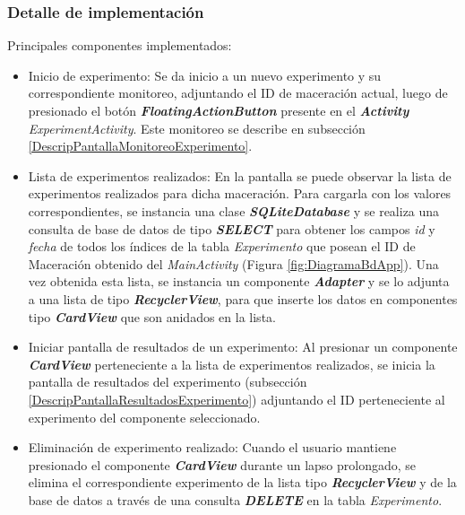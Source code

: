             \subsubsection{Detalle de implementación}
                \par Principales componentes implementados:
                \begin{itemize}
                    \item Inicio de experimento: Se da inicio a un nuevo experimento y su correspondiente monitoreo, adjuntando el ID de maceración actual, luego de presionado el botón \textbf{\textit{\gls{FloatingActionButton}}} presente en el \textbf{\textit{Activity}} \textit{ExperimentActivity}. Este monitoreo se describe en subsección \ref{DescripPantallaMonitoreoExperimento}.
                    
                    \item Lista de experimentos realizados: En la pantalla se puede observar la lista de experimentos realizados para dicha maceración. Para cargarla con los valores correspondientes, se instancia una clase \textbf{\textit{\gls{SQLiteDatabase}}} y se realiza una consulta de base de datos de tipo \textbf{\textit{\gls{SELECT}}} para obtener los campos \textit{id} y \textit{fecha} de todos los índices de la tabla \textit{Experimento} que posean el ID de Maceración obtenido del \textit{MainActivity}  (Figura \ref{fig:DiagramaBdApp}). Una vez obtenida esta lista, se instancia un componente \textbf{\textit{\gls{Adapter}}} y se lo adjunta a una lista de tipo \textbf{\textit{\gls{RecyclerView}}}, para que inserte los datos en componentes tipo \textbf{\textit{\gls{CardView}}} que son anidados en la lista. 
                    
                    \item Iniciar pantalla de resultados de un experimento: Al presionar un componente \textbf{\textit{\gls{CardView}}} perteneciente a la lista de experimentos realizados, se inicia la pantalla de resultados del experimento (subsección \ref{DescripPantallaResultadosExperimento}) adjuntando el ID perteneciente al experimento del componente seleccionado.
                    
                    \item Eliminación de experimento realizado: Cuando el usuario mantiene presionado el componente \textbf{\textit{\gls{CardView}}} durante un lapso prolongado, se elimina el correspondiente experimento de la lista tipo \textbf{\textit{\gls{RecyclerView}}} y de la base de datos a través de una consulta \textbf{\textit{\gls{DELETE}}} en la tabla \textit{Experimento}.
                    

\end{itemize}
